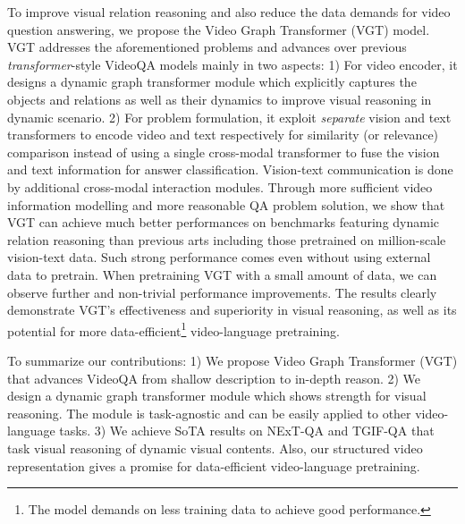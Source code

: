 \documentclass[runningheads]{llncs}
\newcommand{\trans}{\emph{transformer}}
\begin{document}
To improve visual relation reasoning and also reduce the data demands for video question answering, we propose the Video Graph Transformer (VGT) model. VGT addresses the aforementioned problems and advances over previous \trans-style VideoQA models mainly in two aspects:
1) For video encoder, it designs a dynamic graph transformer module which explicitly captures the objects and relations as well as their dynamics to improve visual reasoning in dynamic scenario. 
2) For problem formulation, it exploit \emph{separate} vision and text transformers to encode video and text respectively for similarity (or relevance) comparison instead of using a single cross-modal transformer to fuse the vision and text information for answer classification. Vision-text communication is done by additional cross-modal interaction modules.
Through more sufficient video information modelling and more reasonable QA problem solution, we show that VGT can achieve much better performances on benchmarks featuring dynamic relation reasoning than previous arts including those pretrained on million-scale vision-text data. Such strong performance comes even without using external data to pretrain. When pretraining VGT with a small amount of data, we can observe further and non-trivial performance improvements. The results clearly demonstrate VGT's effectiveness and superiority in visual reasoning, as well as its potential for more data-efficient\footnote{The model demands on less training data to achieve good performance.} video-language pretraining.

To summarize our contributions: 1) We propose Video Graph Transformer (VGT) that advances VideoQA from shallow description to in-depth reason. 2) We design a dynamic graph transformer module which shows strength for visual reasoning. The module is task-agnostic and can be easily applied to other video-language tasks. 3) We achieve SoTA results on NExT-QA \cite{xiao2021next} and TGIF-QA \cite{jang2017tgif} that task visual reasoning of dynamic visual contents. Also, our structured video representation gives a promise for data-efficient video-language pretraining.
\end{document}
